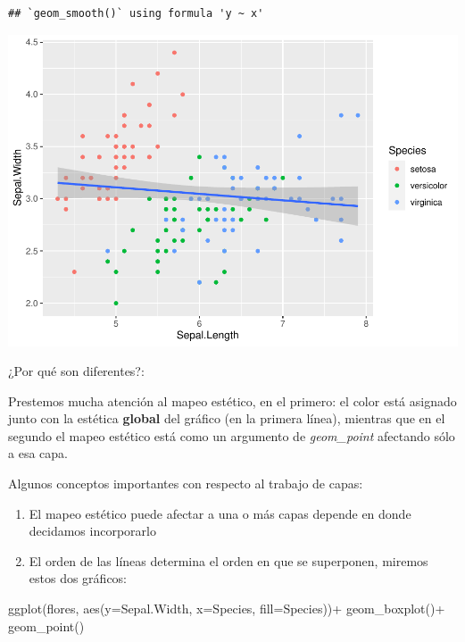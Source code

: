 \documentclass[
]{book}
\newenvironment{Shaded}{\begin{snugshade}}{\end{snugshade}}
\newcommand{\AttributeTok}[1]{\textcolor[rgb]{0.77,0.63,0.00}{#1}}
\newcommand{\FunctionTok}[1]{\textcolor[rgb]{0.00,0.00,0.00}{#1}}
\newcommand{\NormalTok}[1]{#1}
\newcommand{\SpecialCharTok}[1]{\textcolor[rgb]{0.00,0.00,0.00}{#1}}
\begin{document}
\begin{verbatim}
## `geom_smooth()` using formula 'y ~ x'
\end{verbatim}

\includegraphics{Esatadistica_en_R_files/figure-latex/unnamed-chunk-151-1.pdf}

¿Por qué son diferentes?:

Prestemos mucha atención al mapeo estético, en el primero: el color está asignado junto con la estética \textbf{global} del gráfico (en la primera línea), mientras que en el segundo el mapeo estético está como un argumento de \emph{geom\_point} afectando sólo a esa capa.

Algunos conceptos importantes con respecto al trabajo de capas:

\begin{enumerate}
\def\labelenumi{\arabic{enumi}.}
\item
  El mapeo estético puede afectar a una o más capas depende en donde decidamos incorporarlo
\item
  El orden de las líneas determina el orden en que se superponen, miremos estos dos gráficos:
\end{enumerate}

\begin{Shaded}
\begin{Highlighting}[]
\FunctionTok{ggplot}\NormalTok{(flores, }\FunctionTok{aes}\NormalTok{(}\AttributeTok{y=}\NormalTok{Sepal.Width, }\AttributeTok{x=}\NormalTok{Species, }\AttributeTok{fill=}\NormalTok{Species))}\SpecialCharTok{+}
  \FunctionTok{geom\_boxplot}\NormalTok{()}\SpecialCharTok{+}
  \FunctionTok{geom\_point}\NormalTok{()}
\end{Highlighting}
\end{Shaded}
\end{document}
